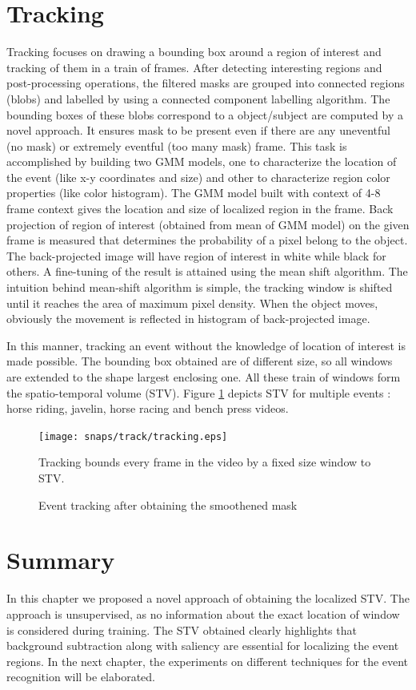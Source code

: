 \section{Tracking}
 \label{sec:trac}
Tracking focuses on drawing a bounding box around a region of interest and tracking of them in a train of frames.  After detecting interesting regions and post-processing operations, the filtered masks are grouped into connected regions (blobs) and labelled by using a connected component labelling algorithm.  The bounding boxes of these blobs correspond to a object/subject are computed by a novel approach.  It ensures mask to be present even if there are any uneventful (no mask) or extremely eventful (too many mask) frame.   This task is accomplished by building two GMM models, one to characterize the location of the event (like x-y coordinates and size) and other to characterize region color properties (like color histogram).  The GMM model built with context of 4-8 frame context gives the location and size of localized region in the frame. 
Back projection \citep{backProj} of region of interest (obtained from mean of GMM model) on the given frame is measured that determines the probability of a pixel belong to the object.  The back-projected image  will have region of interest in white while black for others.  A fine-tuning of the result is attained using the mean shift algorithm.  The intuition behind mean-shift algorithm is simple, the tracking window is shifted until it reaches the area of maximum pixel density.  When the object moves, obviously the movement is reflected in histogram of back-projected image. 
\par In this manner, tracking an event without the knowledge of location of interest is made possible.  The bounding box obtained are of different size, so all windows are extended to the shape largest enclosing one.  All these train of  windows form the spatio-temporal volume (STV). Figure \ref{fig:tracking} depicts STV for multiple events : horse riding, javelin, horse racing and bench press videos.
\begin{figure}[htpb]
   \begin{center}
	    \texttt{[image: snaps/track/tracking.eps]}     
     \caption {Event tracking after obtaining the smoothened mask}
     \medskip \small 
     Tracking bounds every frame in the video by a fixed size window to STV.
   \label{fig:tracking}
   \end{center}
 \end{figure}
\section{Summary}
In this chapter we proposed a novel approach of obtaining the localized STV.  The approach is unsupervised, as no information about the exact location of window is considered during training.  The STV obtained clearly highlights that background subtraction along with saliency are essential for localizing the event regions. In the next chapter, the experiments on different techniques for the event recognition will be elaborated.
